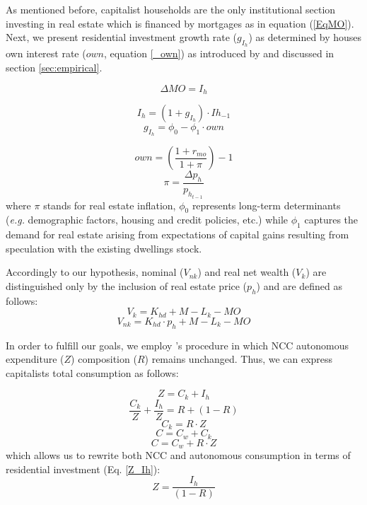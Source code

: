 \documentclass[11pt]{article}
\begin{document}
As mentioned before, capitalist households are the only institutional section investing in real estate which is financed by mortgages as in equation (\ref{EqMO}). Next, we present residential investment growth rate (\(g_{I_h}\)) as determined by houses own interest rate (\(own\), equation \ref{_own}) as introduced by \textcite{teixeira_crescimento_2015} and discussed in section \ref{sec:empirical}.


\begin{equation}
    \label{EqMO}
    \Delta MO = I_h
\end{equation}





\begin{equation}
    I_h = (1 + g_{I_h})\cdot Ih_{-1}
\end{equation}
\begin{equation}
\label{g_Z_own}
g_{I_h} = \phi_0 - \phi_1\cdot own
\end{equation}

\begin{equation}
\label{_own}
own = \left(\frac{1+r_{mo}}{1+\pi}\right) -1
\end{equation}
$$
\pi = \frac{\Delta p_h}{p_{h_{t-1}}}
$$
where \(\pi\) stands for real estate inflation, \(\phi_0\) represents long-term determinants (\emph{e.g.} demographic factors, housing and credit policies, etc.) while \(\phi_1\) captures the demand for real estate arising from expectations of capital gains resulting from speculation with the existing dwellings stock. 

Accordingly to our hypothesis, nominal (\(V_{nk}\)) and real net wealth (\(V_{k}\)) are distinguished only by the inclusion of real estate price (\(p_h\)) and are defined as follows:
\begin{equation}
V_{k} = K_{hd} + M - L_{k} - MO
\end{equation}
\begin{equation}
V_{nk} = K_{hd}\cdot p_h + M - L_{k} - MO
\end{equation}


In order to fulfill our goals, we employ \citeauthor*{freitas_baseline_2020}'s \citeyear{freitas_baseline_2020} procedure in which NCC autonomous expenditure (\(Z\)) composition (\(R\)) remains unchanged. Thus, we can express capitalists total consumption as follows:

\begin{equation}
\label{_Z}
Z = C_k + I_h
\end{equation}
$$
\frac{C_k}{Z} + \frac{I_h}{Z} = R + (1-R)
$$
\begin{equation}
\label{_Ck}
    C_k = R\cdot Z
\end{equation}
\begin{equation}
\label{ConsumoTotal}
C = C_w + C_k
\end{equation}
$$
C = C_w + R\cdot Z
$$
which allows us to rewrite both NCC and autonomous consumption in terms of residential investment (Eq. \ref{Z_Ih}):
\begin{equation}
\label{Z_Ih}
Z = \frac{I_h}{(1-R)}
\end{equation}
\end{document}

